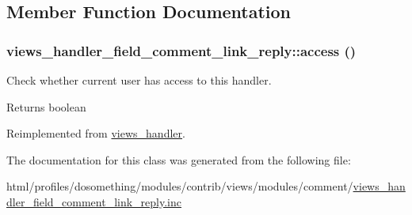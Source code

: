 \subsection{Member Function Documentation}
\hypertarget{classviews__handler__field__comment__link__reply_a62a569f6e9af558f67bedfabde5cef55}{
\subsubsection[{access}]{\setlength{\rightskip}{0pt plus 5cm}views\_\-handler\_\-field\_\-comment\_\-link\_\-reply::access ()}}
\label{classviews__handler__field__comment__link__reply_a62a569f6e9af558f67bedfabde5cef55}
Check whether current user has access to this handler.

\begin{DoxyReturn}{Returns}
boolean 
\end{DoxyReturn}


Reimplemented from \hyperlink{classviews__handler_a3f2fbfe1e0849d06ae77149412b821f6}{views\_\-handler}.

The documentation for this class was generated from the following file:\begin{DoxyCompactItemize}
\item 
html/profiles/dosomething/modules/contrib/views/modules/comment/\hyperlink{views__handler__field__comment__link__reply_8inc}{views\_\-handler\_\-field\_\-comment\_\-link\_\-reply.inc}\end{DoxyCompactItemize}
